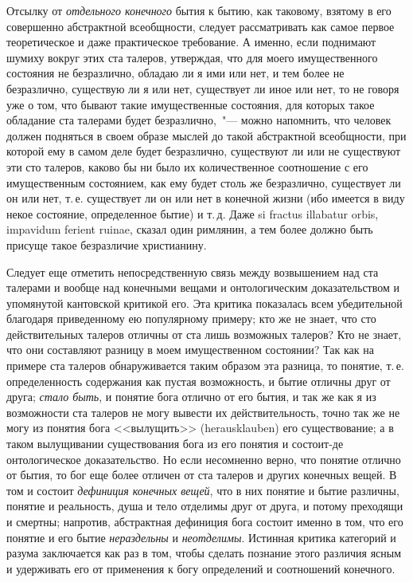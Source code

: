 Отсылку от \emph{отдельного конечного} бытия к бытию, как
таковому, взятому в его совершенно абстрактной всеобщности,
следует рассматривать как самое первое теоретическое
и даже практическое требование. А именно, если
поднимают шумиху вокруг этих ста талеров, утверждая,
что для моего имущественного состояния не безразлично,
обладаю ли я ими или нет, и тем более не безразлично,
существую ли я или нет, существует ли иное или нет, то
не говоря уже о том, что бывают такие имущественные
состояния, для которых такое обладание ста талерами будет
безразлично,~"--- можно напомнить, что человек должен
подняться в своем образе мыслей до такой абстрактной
всеобщности, при которой ему в самом деле будет
безразлично, существуют ли или не существуют эти сто
талеров, каково бы ни было их количественное соотношение
с его имущественным состоянием, как ему будет
столь же безразлично, существует ли он или нет, т.\,е. существует
ли он или нет в конечной жизни (ибо имеется
в виду некое состояние, определенное бытие) и т.\,д. Даже
si fractus illabatur orbis, impavidum ferient ruinae\endnotemark{},
сказал один римлянин, а тем более должно быть присуще
такое безразличие христианину.


Следует еще отметить непосредственную связь между
возвышением над ста талерами и вообще над конечными
вещами и онтологическим доказательством и упомянутой
кантовской критикой его. Эта критика показалась всем
убедительной благодаря приведенному ею популярному
примеру; кто же не знает, что сто действительных талеров
отличны от ста лишь возможных талеров? Кто не
знает, что они составляют разницу в моем имущественном
состоянии? Так как на примере ста талеров обнаруживается
таким образом эта разница, то понятие, т.\,е.
определенность содержания как пустая возможность, и
бытие отличны друг от друга; \emph{стало быть}, и понятие бога
отлично от его бытия, и так же как я из возможности
ста талеров не могу вывести их действительность, точно
так же не могу из понятия бога <<вылущить>> (herausklauben)
его существование; а в таком вылущивании существования
бога из его понятия и состоит-де онтологическое
доказательство. Но если несомненно верно, что понятие
отлично от бытия, то бог еще более отличен от ста
талеров и других конечных вещей. В том и состоит \emph{дефиниция
конечных вещей}, что в них понятие и бытие различны,
понятие и реальность, душа и тело отделимы друг
от друга, и потому преходящи и смертны; напротив, абстрактная
дефиниция бога состоит именно в том, что его
понятие и его бытие \emph{нераздельны} и \emph{неотделимы}. Истинная
критика категорий и разума заключается как раз в
том, чтобы сделать познание этого различия ясным и
удерживать его от применения к богу определений и соотношений
конечного.


